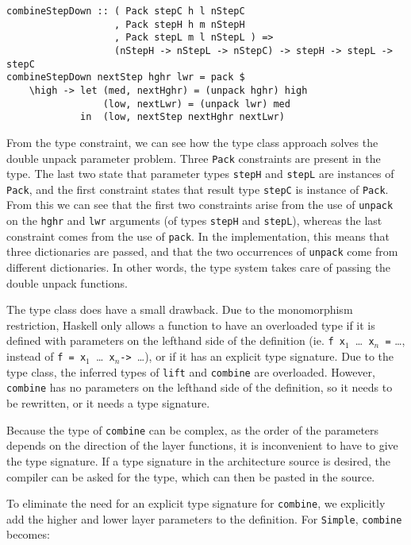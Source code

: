 \begin{small}
\begin{verbatim}
combineStepDown :: ( Pack stepC h l nStepC 
                   , Pack stepH h m nStepH
                   , Pack stepL m l nStepL ) => 
                   (nStepH -> nStepL -> nStepC) -> stepH -> stepL -> stepC
combineStepDown nextStep hghr lwr = pack $
    \high -> let (med, nextHghr) = (unpack hghr) high
                 (low, nextLwr) = (unpack lwr) med
             in  (low, nextStep nextHghr nextLwr)
\end{verbatim}
\end{small}

From the type constraint, we can see how the type class approach solves the double unpack parameter problem. Three \texttt{Pack} constraints are present in the type. The last two state that parameter types \texttt{stepH} and \texttt{stepL} are instances of \texttt{Pack}, and the first constraint states that result type \texttt{stepC} is instance of \texttt{Pack}. From this we can see that the first two constraints arise from the use of \texttt{unpack} on the \texttt{hghr} and \texttt{lwr} arguments (of types \texttt{stepH} and \texttt{stepL}), whereas the last constraint comes from the use of \texttt{pack}. In the implementation, this means that three dictionaries are passed, and that the two occurrences of \texttt{unpack} come from different dictionaries. In other words, the type system takes care of passing the double unpack functions.

The type class does have a small drawback. Due to the monomorphism restriction, Haskell only allows a function to have an overloaded type if it is defined with parameters on the lefthand side of the definition (ie. \texttt{f x$_1$~}\dots \texttt{~x$_n$ =} \dots, instead of \texttt{f = x$_1$~}\dots \texttt{~x$_n$}\verb|-> |\dots), or if it has an explicit type signature. Due to the type class, the inferred types of \texttt{lift} and \texttt{combine} are overloaded. However, \texttt{combine} has no parameters on the lefthand side of the definition, so it needs to be rewritten, or it needs a type signature.

Because the type of \texttt{combine} can be complex, as the order of the parameters depends on the direction of the layer functions, it is inconvenient to have to give the type signature. If a type signature in the architecture source is desired, the compiler can be asked for the type, which can then be pasted in the source.

To eliminate the need for an explicit type signature for \texttt{combine}, we explicitly add the higher and lower layer parameters to the definition. For \texttt{Simple}, \texttt{combine} becomes: 

